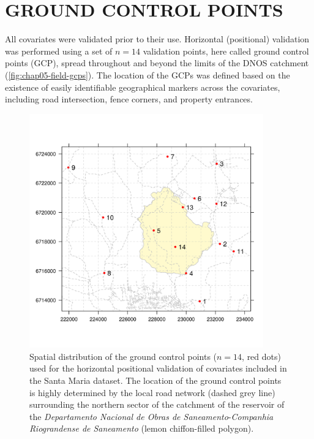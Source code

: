 \section{GROUND CONTROL POINTS}
\label{sec:chap05-gcp}

All covariates were validated prior to their use. Horizontal (positional) validation was performed using a set
of $n = 14$ validation points, here called ground control points (GCP), spread throughout and beyond the 
limits of the DNOS catchment (\autoref{fig:chap05-field-gcps}). The location of the GCPs was defined based on 
the existence of easily identifiable geographical markers across the covariates, including road intersection, 
fence corners, and property entrances.

\begin{figure}[!ht]
\centering
\includegraphics[width = 0.90\textwidth,trim=0 15mm 0 15mm, clip]{fig/chap05-field-gcps}
\caption[Ground control points used for the positional validation of the covariates.]{Spatial distribution of 
the ground control points ($n = 14$, red dots) used for the horizontal positional validation of covariates 
included in the Santa Maria dataset. The location of the ground control points is highly determined by the 
local road network (dashed grey line) surrounding the northern sector of the catchment of the reservoir of the 
\textit{Departamento Nacional de Obras de Saneamento}-\textit{Companhia Riograndense de Saneamento} (lemon 
chiffon-filled polygon).}
\label{fig:chap05-field-gcps}
\end{figure}

